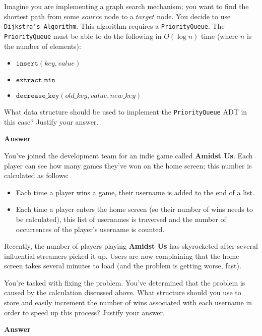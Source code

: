 \documentclass[12pt,twoside]{article}
\newcommand{\answer}{
 \par\medskip
 \textbf{Answer}
}
\newcommand{\answerIIa}{ \answer 

}
\newcommand{\answerIIb}{ \answer

}
\begin{document}
\begin{problems}
\begin{problemparts}
  \problempart {}

  Imagine you are implementing a graph search mechanism; you want to find the
  shortest path from some $source$ node to a $target$ node. You decide to use
  \texttt{Dijkstra's Algorithm}. This algorithm requires a \texttt{PriorityQueue}.
  The \texttt{PriorityQueue} must be able to do the following in $O(\log{n})$ time
  (where $n$ is the number of elements):

    \begin{itemize}
      \item $\texttt{insert}(key, value)$
      \item $\texttt{extract\_min}$
      \item $\texttt{decrease\_key}(old\_key, value, new\_key)$
    \end{itemize}

  What data structure should be used to implement the \texttt{PriorityQueue} ADT
  in this case? Justify your answer.

  \answerIIa

  \problempart {}

  You've joined the development team for an indie game called {\bf Amidst Us}.
  Each player can see how many games they've won on the home screen; this number
  is calculated as follows:

  \begin{itemize}
    \item Each time a player wins a game, their username is added to the end
    of a list.
    \item Each time a player enters the home screen (so their number of wins
    needs to be calculated), this list of usernames is traversed and the number
    of occurrences of the player's username is counted.
  \end{itemize}

  Recently, the number of players playing {\bf Amidst Us} has skyrocketed after
  several influential streamers picked it up. Users are now complaining that the
  home screen takes several minutes to load (and the problem is getting worse,
  fast).

  You're tasked with fixing the problem. You've determined that the problem is
  caused by the calculation discussed above. What structure should you use to
  store and easily increment the number of wins associated with each username
  in order to speed up this process? Justify your answer.

  \answerIIb


\end{problemparts}
\end{problems}
\end{document}
